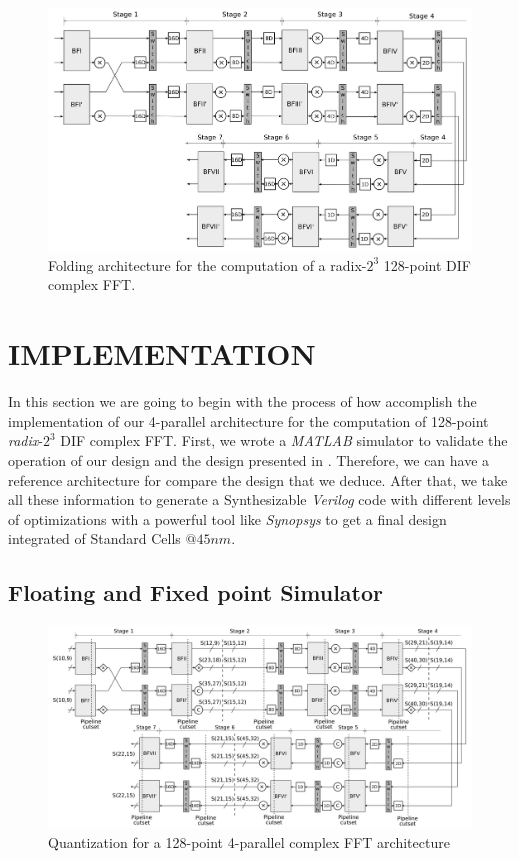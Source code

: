\documentclass[journal,comsoc]{IEEEtran}
\begin{document}
\begin{figure} 
	\centering
	\includegraphics[width=0.8\linewidth]{Diagramas/folding-128.png}
	\caption{Folding architecture for the computation of a radix-$2^3$ 128-point DIF complex FFT.}
	\label{fig:folding_128}
\end{figure}



 
\section{IMPLEMENTATION}
In this section we are going to begin with the process of how accomplish the implementation of our 4-parallel architecture for the computation of 128-point \textit{radix}-$2^3$ DIF complex FFT.
First, we wrote a \textit{MATLAB} simulator to validate the operation of our design and the design presented in \cite{garrido_pipelined_2013,garrido_feedforward_2018}. Therefore, we can have a reference architecture for compare the design that we deduce. After that, we take all these information to generate a Synthesizable \textit{Verilog} code with different levels of optimizations with a powerful tool like \textit{Synopsys} to get a final design integrated of Standard Cells $@45nm$.
\subsection{Floating and Fixed point Simulator}
\begin{figure} 
	\centering
	\includegraphics[width=0.95\linewidth]{Diagramas/folding-128-quant-pipe.png}
	\caption{Quantization for a 128-point 4-parallel complex FFT architecture}
	\label{fig:128_folding_quant_pipe}
\end{figure}
\end{document}
